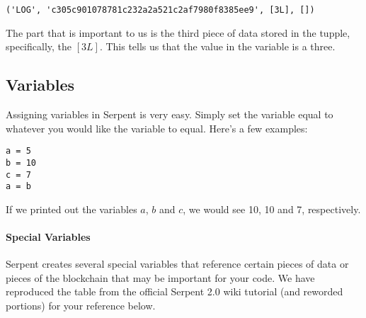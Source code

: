 \documentclass[12pt]{article}
\begin{document}
\begin{verbatim}
('LOG', 'c305c901078781c232a2a521c2af7980f8385ee9', [3L], [])
\end{verbatim}

The part that is important to us is the third piece of data stored in the tupple, specifically, the $[3L]$. This tells us that the value in the variable is a three.

\subsection{Variables}

Assigning variables in Serpent is very easy. Simply set the variable equal to whatever you would like the variable to equal. Here's a few examples:

\begin{verbatim}
a = 5
b = 10
c = 7
a = b
\end{verbatim}

If we printed out the variables $a$, $b$ and $c$, we would see 10, 10 and 7, respectively. 

\paragraph{Special Variables}

Serpent creates several special variables that reference certain pieces of data or pieces of the blockchain that may be important for your code. We have reproduced the table from the official Serpent 2.0 wiki tutorial (and reworded portions) for your reference below. \cite{Serpent}
\end{document}
